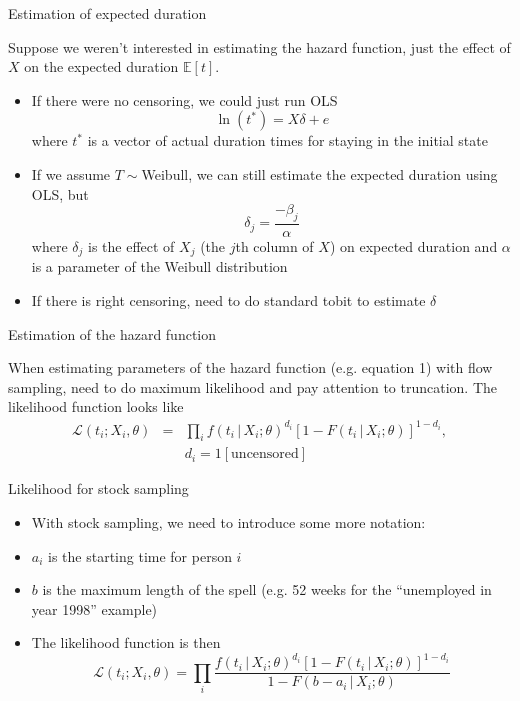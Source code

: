 \documentclass[english,xcolor=dvipsnames]{beamer}
\begin{document}
\begin{frame}{Estimation of expected duration}

Suppose we weren't interested in estimating the hazard function, just
the effect of $X$ on the expected duration $\mathbb{E}\left[t\right]$. 
\begin{itemize}
\item If there were no censoring, we could just run OLS
\[
\ln\left(t^{\ast}\right)=X\delta+e
\]
where $t^{\ast}$ is a vector of actual duration times for staying
in the initial state
\item If we assume $T\sim$Weibull, we can still estimate the expected duration
using OLS, but 
\[
\delta_{j}=\frac{-\beta_{j}}{\alpha}
\]
where $\delta_{j}$ is the effect of $X_{j}$ (the $j$th column of
$X$) on expected duration and $\alpha$ is a parameter of the Weibull
distribution
\item If there is right censoring, need to do standard tobit to estimate
$\delta$
\end{itemize}

\end{frame}


\begin{frame}{Estimation of the hazard function}

When estimating parameters of the hazard function (e.g. equation 1)
with flow sampling, need to do maximum likelihood and pay attention
to truncation. The likelihood function looks like
\begin{eqnarray*}
\mathcal{L}\left(t_{i};X_{i},\theta\right) & = & \prod_{i}f\left(t_{i}\,\vert\, X_{i};\theta\right)^{d_{i}}\left[1-F\left(t_{i}\,\vert\, X_{i};\theta\right)\right]^{1-d_{i}},\\
 &  & d_{i}=1\left[\mbox{uncensored}\right]
\end{eqnarray*}



\end{frame}


\begin{frame}{Likelihood for stock sampling}
\begin{itemize}
\item With stock sampling, we need to introduce some more notation:
\item $a_{i}$ is the starting time for person $i$
\item $b$ is the maximum length of the spell (e.g. 52 weeks for the {}``unemployed
in year 1998'' example)
\item The likelihood function is then
\[
\mathcal{L}\left(t_{i};X_{i},\theta\right)=\prod_{i}\frac{f\left(t_{i}\,\vert\, X_{i};\theta\right)^{d_{i}}\left[1-F\left(t_{i}\,\vert\, X_{i};\theta\right)\right]^{1-d_{i}}}{1-F\left(b-a_{i}\,\vert\, X_{i};\theta\right)}
\]

\end{itemize}

\end{frame}
\end{document}
